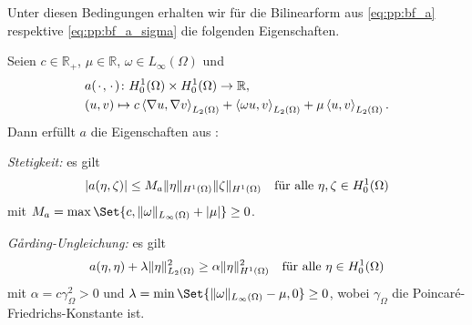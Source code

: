 Unter diesen Bedingungen erhalten wir für die Bilinearform aus \eqref{eq:pp:bf_a} respektive \eqref{eq:pp:bf_a_sigma} die folgenden Eigenschaften.
%
\begin{Satz}
\label{satz:pp:a_bf_bounded_garding}
    Seien $c \in \mathbb{R}_{+}$, $\mu \in \mathbb{R}$, $\omega \in L_{\infty}(\Omega)$ und
    \begin{equation}
    \label{eq:bf_a}
        \begin{aligned}
            &a({\mkern2mu\cdot\mkern2mu}, {\mkern2mu\cdot\mkern2mu}) \colon H^{1}_{0}(\Omega) \times H^{1}_{0}(\Omega) \to \mathbb{R}, \\
            &(u, v) \mapsto c\left\langle\nabla u,\nabla v\right\rangle_{L_{2}(\Omega)} + \left\langle\omega u,v\right\rangle_{L_{2}(\Omega)} + \mu \left\langle u,v\right\rangle_{L_{2}(\Omega)}.
        \end{aligned}
    \end{equation}
    Dann erfüllt $a$ die Eigenschaften aus :
    \begin{thmenumerate}
        \item\label{satz:pp:a_bf_bounded_garding:1}
        \emph{Stetigkeit:} es gilt
        \begin{equation}
            \lvert a(\eta, \zeta)\rvert \leq M_{a} \lVert\eta\rVert_{H^{1}(\Omega)} \lVert\zeta\rVert_{H^{1}(\Omega)} \quad \text{für alle}~\eta, \zeta \in H^{1}_{0}(\Omega)
        \end{equation}
        mit $M_{a} = \max\Set{c, \norm{\omega}_{L_{\infty}(\Omega)} + \abs{\mu}} \geq 0$.
        \item\label{satz:pp:a_bf_bounded_garding:2}
        \emph{G\aa{}rding-Ungleichung:} es gilt
        \begin{equation}
                a(\eta, \eta) + \lambda \lVert\eta\rVert_{L_{2}(\Omega)}^{2} \geq \alpha \lVert\eta\rVert_{H^{1}(\Omega)}^{2} \quad \text{für alle}~\eta \in H^{1}_{0}(\Omega)
        \end{equation}
        mit $\alpha = c \gamma_{\Omega}^{2} > 0$ und $\lambda = \min\Set{\norm{\omega}_{L_{\infty}(\Omega)} - \mu, 0} \geq 0$, wobei $\gamma_{\Omega}$ die Poincaré-Friedrichs-Konstante ist.
    \end{thmenumerate}


\end{Satz}
